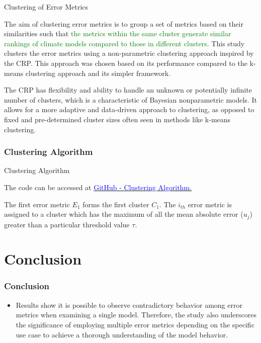 \documentclass[xcolor={dvipsnames}]{beamer}
\begin{document}
\begin{frame}{Clustering of Error Metrics}

The aim of clustering error metrics is to group a set of metrics based on their similarities such that \textcolor{green}{the metrics within the same cluster generate similar rankings of climate models compared to those in different clusters}. This study clusters the error metrics using a non-parametric clustering approach inspired by the CRP. This approach was chosen based on its performance compared to the k-means clustering approach and its simpler framework.

\hfill

\pause

The CRP has flexibility and ability to handle an unknown or potentially infinite number of clusters, which is a characteristic of Bayesian nonparametric models. It allows for a more adaptive and data-driven approach to clustering, as opposed to fixed and pre-determined cluster sizes often seen in methods like k-means clustering.
    
\end{frame}

\subsubsection{Clustering Algorithm}

\begin{frame}{Clustering Algorithm}

The code can be accessed at \href{https://github.com/AlexFidalgo/BergenProject/blob/main/Bergen_Metrics/clustering_algorithm/clustering_algorithm.py}{\textcolor{blue}{GitHub - Clustering Algorithm}.}

\hfill

The first error metric $E_1$ forms the first cluster $C_1$. The $i_{th}$ error metric is assigned to a cluster which has the maximum of all the mean absolute error ($u_j$) greater than a particular threshold value $\tau$.
    
\end{frame}
    




\section{Conclusion}

\begin{frame}
\frametitle{Conclusion}

\begin{itemize}
    \item Results show it is possible to observe contradictory behavior among error metrics when examining a single model. Therefore, the study also underscores the significance of employing multiple error metrics depending on the specific use case to achieve a thorough understanding of the model behavior.

\end{itemize}

\end{frame}
\end{document}
